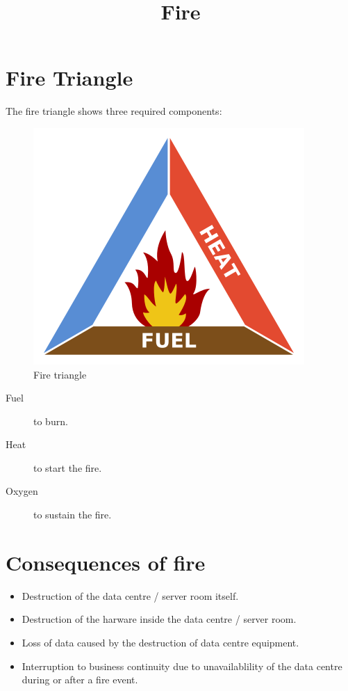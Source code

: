\documentclass{pgnotes}
\title{Fire}
\begin{document}
\maketitle

\section{Fire Triangle}
\label{sec:fire-triangle}

The fire triangle shows three required components:

\begin{figure}[htbp]
  \centering
  \includegraphics[width=0.5\linewidth]{fire_triangle}
  \caption{Fire triangle}
  \label{fig:fire-triangle}
\end{figure}

\begin{description}
\item[Fuel]
to burn.
\item[Heat]
to start the fire.
\item[Oxygen]
to sustain the fire.
\end{description}

\section{Consequences of fire}
\label{sec:consequences-of-fire}

\begin{itemize}
\item
  Destruction of the data centre / server room itself.
\item
  Destruction of the harware inside the data centre / server room.
\item
  Loss of data caused by the destruction of data centre equipment.
\item
  Interruption to business continuity due to unavailablility of the data
  centre during or after a fire event.
\end{itemize}
\end{document}
